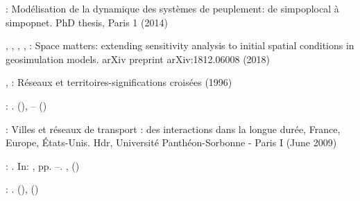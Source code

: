 \documentclass{article}
\begin{document}
\begin{thebibliography}{43}
\begin{botherref}
:
Mod{\'e}lisation de la dynamique des syst{\`e}mes de peuplement: de simpoplocal
  {\`a} simpopnet.
PhD thesis,
Paris 1
(2014)
\end{botherref}
\endbibitem

\begin{botherref}
,
,
,
,
:
Space matters: extending sensitivity analysis to initial spatial conditions in
  geosimulation models.
arXiv preprint arXiv:1812.06008
(2018)
\end{botherref}
\endbibitem

\begin{botherref}
,
:
R{\'e}seaux et territoires-significations crois{\'e}es
(1996)
\end{botherref}
\endbibitem

\begin{barticle}
:
.
(),
--
()
\end{barticle}
\endbibitem

\begin{botherref}
:
{Villes et r{\'e}seaux de transport : des interactions dans la longue
  dur{\'e}e, France, Europe, {\'E}tats-Unis}.
Hdr,
Universit{\'e} Panth{\'e}on-Sorbonne - Paris I
(June 2009)
\end{botherref}
\endbibitem

\begin{bchapter}
:
.
In: ,
pp. --.
, 
()
\end{bchapter}
\endbibitem

\begin{barticle}
:
.
(),
()
\end{barticle}
\endbibitem


\end{thebibliography}
\end{document}
